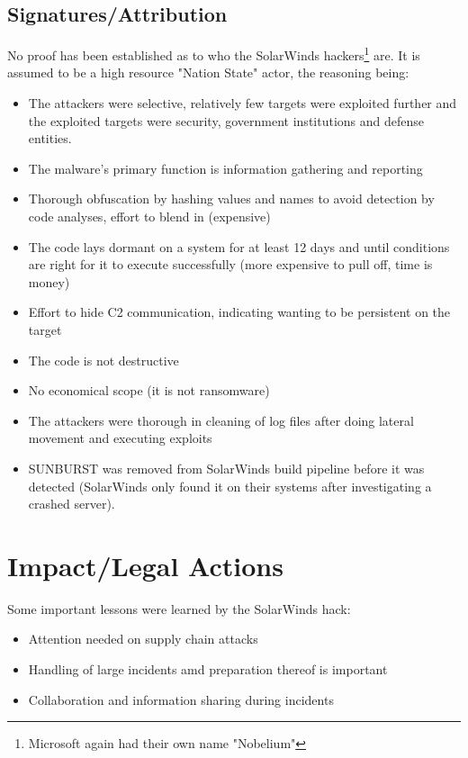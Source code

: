 \documentclass[
	letterpaper, %
	10pt, %
	unnumberedsections, %
	twoside, %
]{LTJournalArticle}
\begin{document}
\subsection{Signatures/Attribution}
No proof has been established as to who the SolarWinds hackers\footnote{Microsoft again had their own name "Nobelium"} are.
It is assumed to be a high resource "Nation State" actor, the reasoning being:
\begin{itemize}
	\item The attackers were selective, relatively few targets were exploited further and the exploited targets were security, government institutions and defense entities.
	\item The malware's primary function is information gathering and reporting
	\item Thorough obfuscation by hashing values and names to avoid detection by code analyses, effort to blend in (expensive)   
	\item The code lays dormant on a system for at least 12 days and until conditions are right for it to execute successfully (more expensive to pull off, time is money)
	\item Effort to hide C2 communication, indicating wanting to be persistent on the target
	\item The code is not destructive
	\item No economical scope (it is not ransomware)
	\item The attackers were thorough in cleaning of log files after doing lateral movement and executing exploits 
	\item SUNBURST was removed from SolarWinds build pipeline before it was detected (SolarWinds only found it on their systems after investigating a crashed server).
	
\end{itemize} 


\section{Impact/Legal Actions} 
Some important lessons were learned by the SolarWinds hack:
\begin{itemize}
	\item Attention needed on supply chain attacks
	\item Handling of large incidents amd preparation thereof is important
	\item Collaboration and information sharing during incidents
\end{itemize} 
\end{document}
